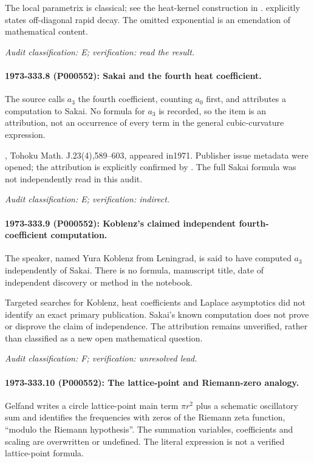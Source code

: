 The local parametrix is classical; see the heat-kernel construction in \citet{mckeansinger1967curvature}. \citet[introduction, p.~202]{gilkey1979recursion} explicitly states off-diagonal rapid decay. The omitted exponential is an emendation of mathematical content.

\emph{Audit classification: E; verification: read the result.}

\paragraph{1973-333.8 (P000552): Sakai and the fourth heat coefficient.}
The source calls \(a_3\) the fourth coefficient, counting \(a_0\) first, and attributes a computation to Sakai. No formula for \(a_3\) is recorded, so the item is an attribution, not an occurrence of every term in the general cubic-curvature expression.

\citet{sakai1971eigenvalues}, Tohoku Math. J.23(4),589--603, appeared in1971. Publisher issue metadata were opened; the attribution is explicitly confirmed by \citet[introduction]{gilkey1979recursion}. The full Sakai formula was not independently read in this audit.

\emph{Audit classification: E; verification: indirect.}

\paragraph{1973-333.9 (P000552): Koblenz’s claimed independent fourth-coefficient computation.}
The speaker, named Yura Koblenz from Leningrad, is said to have computed \(a_3\) independently of Sakai. There is no formula, manuscript title, date of independent discovery or method in the notebook.

Targeted searches for Koblenz, heat coefficients and Laplace asymptotics did not identify an exact primary publication. Sakai’s known computation does not prove or disprove the claim of independence. The attribution remains unverified, rather than classified as a new open mathematical question.

\emph{Audit classification: F; verification: unresolved lead.}

\paragraph{1973-333.10 (P000552): The lattice-point and Riemann-zero analogy.}
Gelfand writes a circle lattice-point main term \(\pi r^2\) plus a schematic oscillatory sum and identifies the frequencies with zeros of the Riemann zeta function, “modulo the Riemann hypothesis”. The summation variables, coefficients and scaling are overwritten or undefined. The literal expression is not a verified lattice-point formula.

